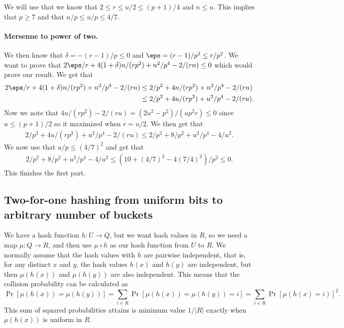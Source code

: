 We will use that we know that $2 \le r \le u/2 \le (p + 1)/4$ and $n \le u$.
This implies that $p \ge 7$ and that $n/p \le u/p \le 4/7$.

\paragraph{Mersenne to power of two.} We then know that $\delta = -(r - 1)/p \le 0$ 
and $\eps = (r - 1)/p^2 \le r/p^2$. We want to prove that
$2\eps/r + 4(1 + \delta)n / (rp^2) + n^2/p^4 - 2/(rn) \le 0$ which would
prove our result. We get that
\begin{align*}
    2\eps/r + 4(1 + \delta)n / (rp^2) + n^2/p^4 - 2/(rn) 
        &\le 2/p^2 + 4n/(r p^2) + n^2/p^4 - 2/(rn)
        \\&\le 2/p^2 + 4u/(r p^2) + u^2/p^4 - 2/(ru) .
\end{align*}
Now we note that $4u/(r p^2) - 2/(ru) = (2u^2 - p^2)/(u p^2 r) \le 0$
since $u \le (p + 1)/2$ so it maximized when $r = u/2$. We then get
that
\begin{align*}
    2/p^2 + 4u/(r p^2) + u^2/p^4 - 2/(ru)
        \le 2/p^2 + 8/p^2 + u^2 / p^4 - 4/u^2 .
\end{align*}
We now use that $u/p \le (4/7)^2$ and get that
\begin{align*}
    2/p^2 + 8/p^2 + u^2 / p^4 - 4/u^2
        \le (10 + (4/7)^2 - 4 (7/4)^2)/p^2
        \le 0 .
\end{align*}
This finishes the first part.

\subsection{Two-for-one hashing from uniform bits to arbitrary number of buckets}
We have a hash function $h:U\to Q$, but we want hash values in $R$, so
we need a map $\mu:Q\to R$, and then use $\mu\circ h$ as
our hash function from $U$ to $R$. We normally assume that the hash values 
with $h$ are pairwise independent, that is, for any distinct $x$ and $y$,
the hash values $h(x)$ and $h(y)$ are independent, but then 
$\mu(h(x))$ and $\mu(h(y))$ are also independent. This means
that the collision probability can be calculated
as 
\[\Pr[\mu(h(x))=\mu(h(y))]=\sum_{i\in R}\Pr[\mu(h(x))=\mu(h(y))=i]=\sum_{i\in R}\Pr[\mu(h(x)=i)]^2.\]
This sum of squared probabilities attains is minimum value $1/|R|$
exactly when $\mu(h(x))$ is uniform in $R$. 

